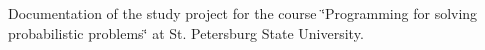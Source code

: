 Documentation of the study project for the course \char`\"{}\+Programming for solving probabilistic problems\char`\"{} at St. Petersburg State University. 